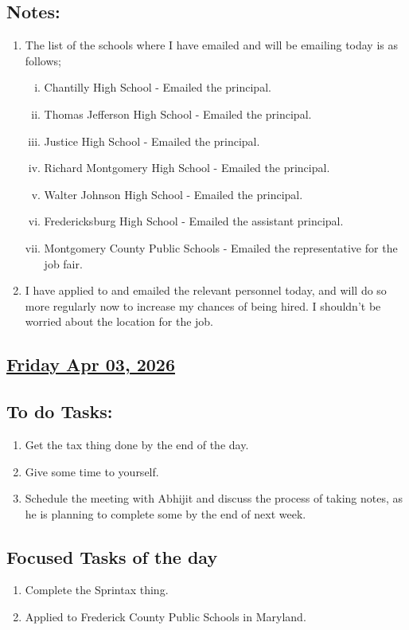 \subsection*{Notes:}
\begin{enumerate}
    \item The list of the schools where I have emailed and will be emailing today is as follows;
    \begin{enumerate}[i.]
        \item Chantilly High School - Emailed the principal. \cmark
        \item Thomas Jefferson High School - Emailed the principal. 
        \item Justice High School - Emailed the principal. 
        \item Richard Montgomery High School - Emailed the principal. 
        \item Walter Johnson High School - Emailed the principal.
        \item Fredericksburg High School - Emailed the assistant principal.
        \item Montgomery County Public Schools - Emailed the representative for the job fair.
    \end{enumerate}

    \item I have applied to and emailed the relevant personnel today, and will do so more regularly now to increase my chances of being hired. I shouldn't be worried about the location for the job. 
\end{enumerate}
\subsection*{\underline{Friday Apr 03, 2026}}
\subsection*{To do Tasks:}
\begin{enumerate}
    \item Get the tax thing done by the end of the day. 
    \item Give some time to yourself.
    \item Schedule the meeting with Abhijit and discuss the process of taking notes, as he is planning to complete some by the end of next week. 
\end{enumerate}
\subsection*{Focused Tasks of the day}
\begin{enumerate}[\ding{212}]  
    \item Complete the Sprintax thing. \cmark
    \item Applied to Frederick County Public Schools in Maryland.\cmark
\end{enumerate}

